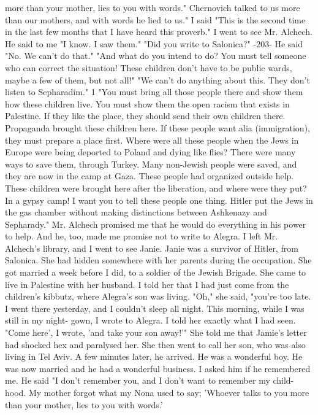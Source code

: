 more than your mother, lies to you with words."
Chernovich talked to 
us more than our mothers, and with words he lied to us."
I said "This is the second time in the last few months that I have 
heard this proverb."
I went to see Mr.
Alchech.
He said to me "I know.
I saw them."
"Did you write to Salonica?"
-203- 
He said "No.
We can't do that."
"And what do you intend to do?
You must tell someone who can 
correct the situation!
These children don't have to be public wards, 
maybe a few of them, but not all!"
"We can't do anything about this.
They don't listen to Sepharadim."
1 
"You must bring all those people there and show them how these 
children live.
You must show them the open racism that exists in Palestine.
If they like the place, they should send their own children 
there.
Propaganda brought these children here.
If these people want 
alia (immigration), they must prepare a place first.
Where were all 
these people when the Jews in Europe were being deported to Poland and 
dying like flies?
There were many ways to save them, through Turkey.
Many non-Jewish people were saved, and they are now in the camp at Gaza.
These people had organized outside help.
These children were brought 
here after the liberation, and where were they put?
In a gypsy camp!
I want you to tell these people one thing.
Hitler put the Jews in the 
gas chamber without making distinctions between Ashkenazy and Sepharady."
Mr.
Alchech promised me that he would do everything in his power 
to help.
And he, too, made me promise not to write to Alegra.
I left 
Mr.
Alchech's library, and I went to see Janie.
Janie was a survivor of Hitler, from Salonica.
She had hidden 
somewhere with her parents during the occupation.
She got married a 
week before I did, to a soldier of the Jewish Brigade.
She came to 
live in Palestine with her husband.
I told her that I had just come 
from the children's kibbutz, where Alegra's son was living.
"Oh," she said, "you're too late.
I went there yesterday, and I 
couldn't sleep all night.
This morning, while I was still in my night-
gown, I wrote to Alegra.
I told her exactly what I had seen.
"Come 
here', I wrote, 'and take your son away!'"
She told me that Jamie's letter had shocked hex and paralysed her.
She then went to call her son, who was also living in Tel Aviv.
A few 
minutes later, he arrived.
He was a wonderful boy.
He was now married and he had a wonderful business.
I asked him if he remembered me.
He said "I don't remember you, and I don't want to remember my child-
hood.
My mother forgot what my Nona used to say; 'Whoever talks to 
you more than your mother, lies to you with words.'
